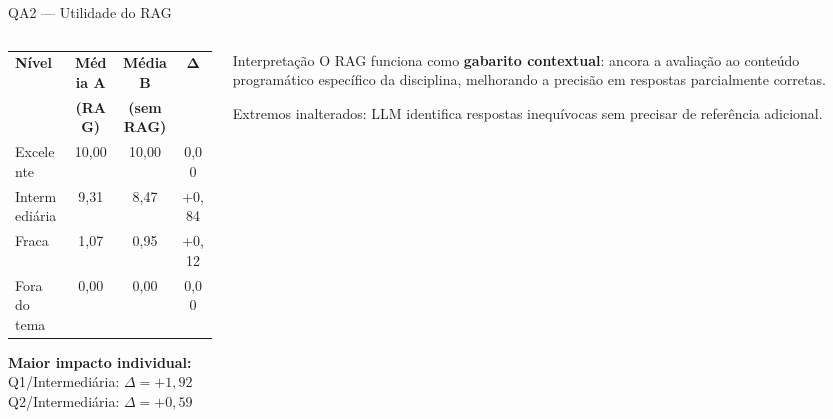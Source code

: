 \documentclass[10pt,aspectratio=169]{beamer}
\begin{document}
\begin{frame}{QA2 — Utilidade do RAG}
  \begin{columns}[T]
    \begin{column}{0.55\textwidth}
      \begin{center}
        \small
        \begin{tabular}{lccc}
          \toprule
          \textbf{Nível} & \textbf{Média A} & \textbf{Média B} & $\boldsymbol{\Delta}$ \\
          & \textbf{(RAG)} & \textbf{(sem RAG)} & \\
          \midrule
          Excelente      & 10,00 & 10,00 & 0,00 \\
          Intermediária  & 9,31  & 8,47  & \alert{+0,84} \\
          Fraca          & 1,07  & 0,95  & +0,12 \\
          Fora do tema   & 0,00  & 0,00  & 0,00 \\
          \bottomrule
        \end{tabular}
      \end{center}
      \vspace{0.5em}
      \textbf{Maior impacto individual:}\\
      Q1/Intermediária: $\Delta = +1{,}92$ \quad Q2/Intermediária: $\Delta = +0{,}59$
    \end{column}
    \begin{column}{0.41\textwidth}
      \begin{alertblock}{Interpretação}
        O RAG funciona como \textbf{gabarito contextual}: ancora a avaliação ao conteúdo programático específico da disciplina, melhorando a precisão em respostas parcialmente corretas.
      \end{alertblock}
      \vspace{0.4em}
      Extremos inalterados: LLM identifica respostas inequívocas sem precisar de referência adicional.
    \end{column}
  \end{columns}
\end{frame}
\end{document}
